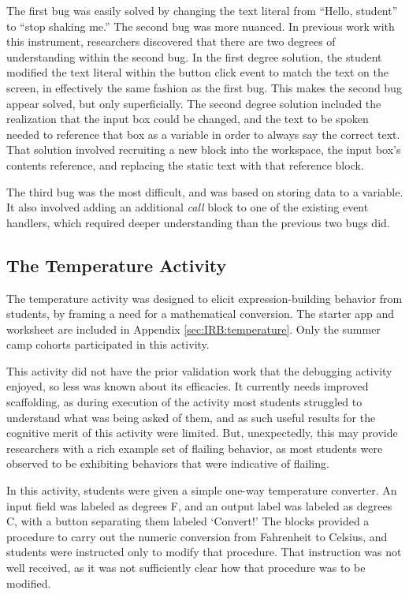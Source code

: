 The first bug was easily solved by changing the text literal from ``Hello, student'' to ``stop shaking me.'' The second bug was more nuanced. In previous work with this instrument, researchers discovered that there are two degrees of understanding within the second bug. In the first degree solution, the student modified the text literal within the button click event to match the text on the screen, in effectively the same fashion as the first bug. This makes the second bug appear solved, but only superficially. The second degree solution included the realization that the input box could be changed, and the text to be spoken needed to reference that box as a variable in order to always say the correct text. That solution involved recruiting a new block into the workspace, the input box's contents reference, and replacing the static text with that reference block.

The third bug was the most difficult, and was based on storing data to a variable. It also involved adding an additional \emph{call} block to one of the existing event handlers, which required deeper understanding than the previous two bugs did. %

\subsection{The Temperature Activity}

The temperature activity was designed to elicit expression-building behavior from students, by framing a need for a mathematical conversion. The starter app and worksheet are included in Appendix \ref{sec:IRB:temperature}. Only the summer camp cohorts participated in this activity.

This activity did not have the prior validation work that the debugging activity enjoyed, so less was known about its efficacies. It currently needs improved scaffolding, as during execution of the activity most students struggled to understand what was being asked of them, and as such useful results for the cognitive merit of this activity were limited. But, unexpectedly, this may provide researchers with a rich example set of flailing behavior, as most students were observed to be exhibiting behaviors that were indicative of flailing. 

In this activity, students were given a simple one-way temperature converter. An input field was labeled as degrees F, and an output label was labeled as degrees C, with a button separating them labeled `Convert!' The blocks provided a procedure to carry out the numeric conversion from Fahrenheit to Celsius, and students were instructed only to modify that procedure. That instruction was not well received, as it was not sufficiently clear how that procedure was to be modified. 

